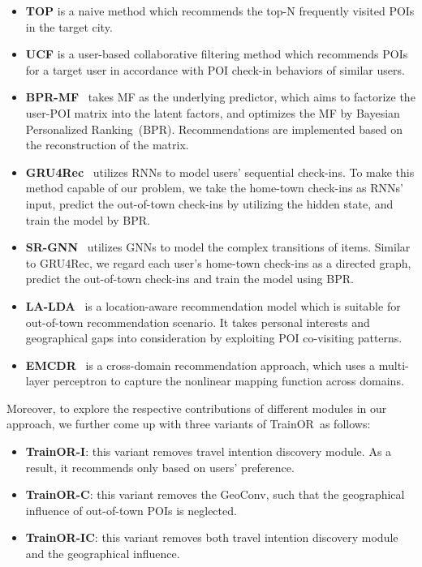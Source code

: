 \documentclass[letterpaper]{article} %
\newcommand{\ourmodel}{{\sc TrainOR}}
\begin{document}
\begin{itemize}
  \item 
  \textbf{TOP} is a naive method which recommends the top-N frequently visited POIs in the target city.
  \item 
  \textbf{UCF} is a user-based collaborative filtering method which recommends POIs for a target user in accordance with POI check-in behaviors of similar users. 
  \item 
  \textbf{BPR-MF}~\cite{rendle2012bpr} takes MF as the underlying predictor, which aims to factorize the user-POI matrix into the latent factors, and optimizes the MF by Bayesian Personalized Ranking~(BPR). 
  Recommendations are implemented based on the reconstruction of the matrix. 
  \item 
  \textbf{GRU4Rec}~\cite{hidasi2015session} utilizes RNNs to model users' sequential check-ins. 
  To make this method capable of our problem, we take the home-town check-ins as RNNs' input, predict the out-of-town check-ins by utilizing the hidden state, and train the model by BPR.
  \item 
  \textbf{SR-GNN}~\cite{wu2019session} utilizes GNNs to model the complex transitions of items. 
  Similar to GRU4Rec, we regard each user's home-town check-ins as a directed graph, predict the out-of-town check-ins and train the model using BPR.
  \item 
  \textbf{LA-LDA}~\cite{yin2014lcars} is a location-aware recommendation model which is suitable for out-of-town recommendation scenario. 
  It takes personal interests and geographical gaps into consideration by exploiting POI co-visiting patterns.
  \item 
  \textbf{EMCDR}~\cite{man2017cross} is a cross-domain recommendation approach, which uses a multi-layer perceptron to capture the nonlinear mapping function across domains.
\end{itemize}

Moreover, to explore the respective contributions of different modules in our approach, we further come up with three variants of \ourmodel~as follows:

\begin{itemize}
    \item 
    \textbf{\ourmodel-I}: this variant removes travel intention discovery module. 
    As a result, it recommends only based on users' preference.
    \item 
    \textbf{\ourmodel-C}: this variant removes the GeoConv, such that the geographical influence of out-of-town POIs is neglected.
    \item 
    \textbf{\ourmodel-IC}: this variant removes both travel intention discovery module and the geographical influence.
\end{itemize}
\end{document}

